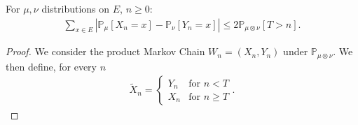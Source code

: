 \begin{prop}[]
	For $\mu, \nu $ distributions on $E$, $n\geq 0$: 
\begin{align}
	\boxed{ \sum_{x \in E}^{} |\mathbb{P}_{\mu } \left[ X_n=x \right] - \mathbb{P}_{\nu} \left[Y_n=x  \right] | \leq 2 \mathbb{P}_{\mu \otimes \nu } \left[ T>n \right] }
.\end{align}
\end{prop}
\begin{proof}
	We consider the product Markov Chain $W_n = (X_n, Y_n)$ under $\mathbb{P}_{\mu \otimes \nu}$. We then define, for every $n$ 
	\begin{align}
		\tilde{X}_n =
	\begin{cases}
		Y_n & \textrm{for } n < T \\
		X_n & \textrm{for } n \geq T
	\end{cases}
	.\end{align}


\end{proof}
